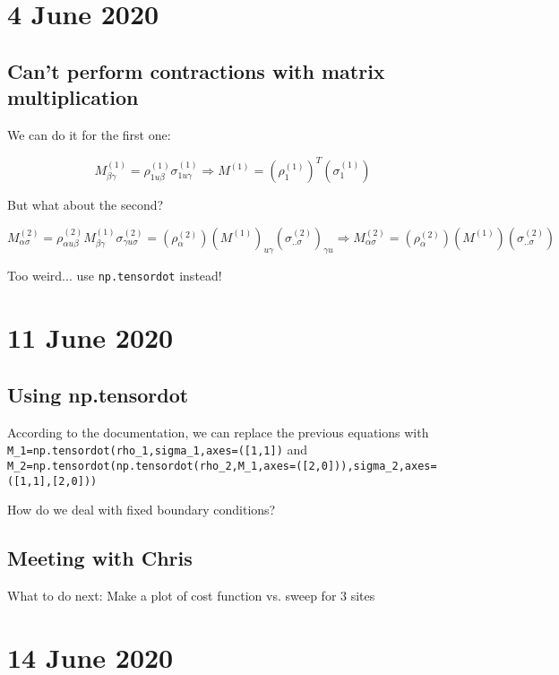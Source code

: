 \documentclass{report}
\begin{document}
\chapter{4 June 2020}

\section{Can't perform contractions with matrix multiplication}

We can do it for the first one:

\begin{equation}M^{(1)}_{\beta\gamma}=\rho^{(1)}_{1u\beta}\sigma^{(1)}_{1u\gamma}\Rightarrow M^{(1)}=(\rho^{(1)}_1)^T(\sigma^{(1)}_1)\end{equation}

But what about the second?

\[M^{(2)}_{\alpha\sigma}=\rho^{(2)}_{\alpha u\beta}M^{(1)}_{\beta\gamma}\sigma^{(2)}_{\gamma u\sigma}=(\rho^{(2)}_\alpha)(M^{(1)})_{u\gamma}(\sigma^{(2)}_{..\sigma})_{\gamma u}\Rightarrow M^{(2)}_{\alpha\sigma}=(\rho^{(2)}_\alpha)(M^{(1)})(\sigma^{(2)}_{..\sigma})\]

Too weird... use \lstinline{np.tensordot} instead!

\chapter{11 June 2020}

\section{Using np.tensordot}

According to the documentation, we can replace the previous equations with \lstinline{M_1=np.tensordot(rho_1,sigma_1,axes=([1,1])} and \lstinline{M_2=np.tensordot(np.tensordot(rho_2,M_1,axes=([2,0])),sigma_2,axes=([1,1],[2,0]))}

How do we deal with fixed boundary conditions?

\section{Meeting with Chris}

What to do next: Make a plot of cost function vs. sweep for 3 sites

\chapter{14 June 2020}
\end{document}

